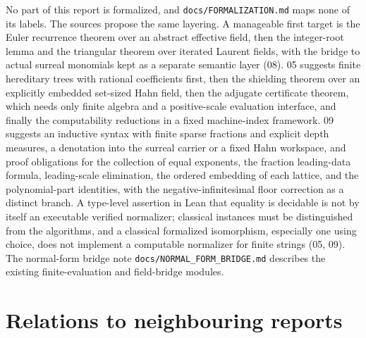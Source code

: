 \documentclass[11pt,oneside]{article}
\numberwithin{equation}{section}
\theoremstyle{definition}
\theoremstyle{remark}
\newcommand{\fn}[1]{\nolinkurl{#1}}
\begin{document}
No part of this report is formalized, and \fn{docs/FORMALIZATION.md} maps none of
its labels. The sources propose the same layering. A manageable first target is
the Euler recurrence theorem over an abstract effective field, then the
integer-root lemma and the triangular theorem over iterated Laurent fields, with
the bridge to actual surreal monomials kept as a separate semantic layer (08).
05 suggests finite hereditary trees with rational coefficients first, then the
shielding theorem over an explicitly embedded set-sized Hahn field, then the
adjugate certificate theorem, which needs only finite algebra and a positive-scale
evaluation interface, and finally the computability reductions in a fixed
machine-index framework. 09 suggests an inductive syntax with finite sparse
fractions and explicit depth measures, a denotation into the surreal carrier or a
fixed Hahn workspace, and proof obligations for the collection of equal exponents,
the fraction leading-data formula, leading-scale elimination, the ordered
embedding of each lattice, and the polynomial-part identities, with the
negative-infinitesimal floor correction as a distinct branch. A type-level
assertion in Lean that equality is decidable is not by itself an executable
verified normalizer; classical instances must be distinguished from the
algorithms, and a classical formalized isomorphism, especially one using choice,
does not implement a computable normalizer for finite strings (05, 09). The
normal-form bridge note \fn{docs/NORMAL_FORM_BRIDGE.md} describes the existing
finite-evaluation and field-bridge modules.

\section{Relations to neighbouring reports}\label{onot:sec:neighbours}
\end{document}
